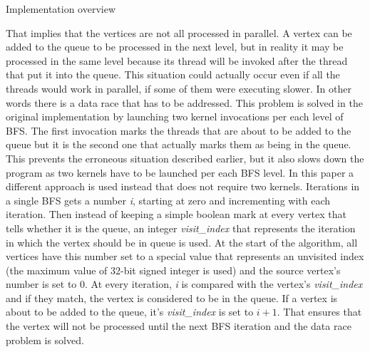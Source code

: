\documentclass[a4paper,12pt,notitlepage,oneside]{article}
\newcommand{\parspace}[1][]{
	\ifthenelse{\isempty{#1}}{\vspace{5mm}}{\vspace{#1}}
	\par
}
\begin{document}
\begin{section}{Implementation overview}
\parspace That implies that the vertices are not all processed in parallel. A vertex can be added to the queue to be processed in the next level, but in reality
it may be processed in the same level because its thread will be invoked after the thread that put it into the queue. This situation could actually occur even
if all the threads would work in parallel, if some of them were executing slower. In other words there is a data race that has to be addressed. This problem is solved in the original implementation by launching two kernel invocations per each level of BFS. The first invocation marks the threads that are about to be
added to the queue but it is the second one that actually marks them as being in the queue.
This prevents the erroneous situation described earlier, but it also slows down the program as two kernels have to be launched per each BFS level. In this paper a different approach is used instead that does not require two kernels. Iterations in a single BFS gets a number \textit{i}, starting at zero and incrementing
with each iteration. Then instead of keeping a simple boolean mark at every vertex that tells whether it is the queue, an integer \textit{visit\_index} that represents the iteration in which the vertex should be in queue is used. At the start of the algorithm, all vertices have this number set to a special value
that represents an unvisited index (the maximum value of 32-bit signed integer is used) and the source vertex's number is set to 0.
At every iteration, \textit{i} is compared with the vertex's \textit{visit\_index} and if they match, the vertex is considered to be in the queue. If a vertex is
about to be added to the queue, it's \textit{visit\_index} is set to \(i + 1\). That ensures that the vertex will not be processed until the next BFS iteration and the data race problem is solved.


\end{section}
\end{document}
